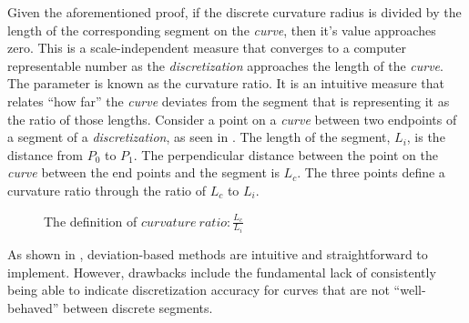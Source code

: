 Given the aforementioned proof, if the discrete curvature radius is 
divided by the length of the corresponding segment on the \textit{curve}, then it’s value approaches zero. This is a scale-independent measure that converges to a computer representable number as the \textit{discretization} approaches the length of the \textit{curve}. The parameter is known as the curvature ratio. It is an intuitive measure that relates ``how far'' the \textit{curve} deviates from the segment that is representing it as the ratio of those lengths. Consider a point on a \textit{curve} between two endpoints of a segment of a \textit{discretization}, as seen in . The length of the segment, $L_i$, is the distance from $P_0$ to $P_1$. The perpendicular distance between the point on the \textit{curve} between the end points and the segment is $L_c$. The three points define a curvature ratio through the ratio of $L_c$ to $L_i$.

\begin{figure}[h!]
  \caption{\label{ref:CurvatureRatio} The definition of $curvature \ 
ratio:  \frac{L_c}{L_i}$ 
\cite{mclaurin10}}
\end{figure}

\noindent As shown in \cite{mclaurin12}, deviation-based methods are 
intuitive and straightforward to implement. However, drawbacks include the fundamental lack of consistently being able to indicate discretization accuracy for curves that are not ``well-behaved'' between discrete segments.
